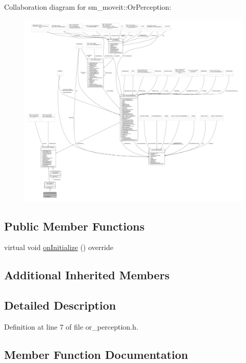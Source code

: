 Collaboration diagram for sm\+\_\+moveit\+:\+:Or\+Perception\+:
\nopagebreak
\begin{figure}[H]
\begin{center}
\leavevmode
\includegraphics[width=350pt]{classsm__moveit_1_1OrPerception__coll__graph}
\end{center}
\end{figure}
\subsection*{Public Member Functions}
\begin{DoxyCompactItemize}
\item 
virtual void \hyperlink{classsm__moveit_1_1OrPerception_af5721051a0575a4a1f3d50aef7f2bdba}{on\+Initialize} () override
\end{DoxyCompactItemize}
\subsection*{Additional Inherited Members}


\subsection{Detailed Description}


Definition at line 7 of file or\+\_\+perception.\+h.



\subsection{Member Function Documentation}
